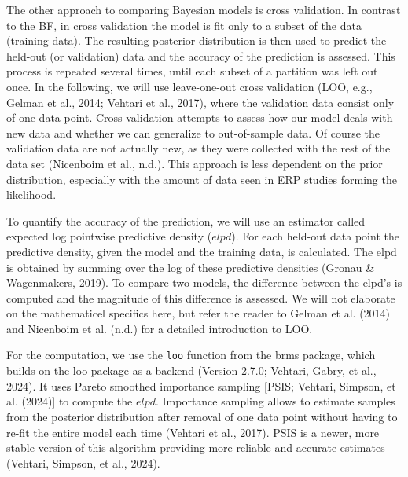 \documentclass[
  doc,12pt,floatsintext]{apa7}
\begin{document}
The other approach to comparing Bayesian models is cross validation. In contrast to the BF, in cross validation the model is fit only to a subset of the data (training data). The resulting posterior distribution is then used to predict the held-out (or validation) data and the accuracy of the prediction is assessed. This process is repeated several times, until each subset of a partition was left out once. In the following, we will use leave-one-out cross validation (LOO, e.g., Gelman et al., 2014; Vehtari et al., 2017), where the validation data consist only of one data point. Cross validation attempts to assess how our model deals with new data and whether we can generalize to out-of-sample data. Of course the validation data are not actually new, as they were collected with the rest of the data set (Nicenboim et al., n.d.). This approach is less dependent on the prior distribution, especially with the amount of data seen in ERP studies forming the likelihood.

To quantify the accuracy of the prediction, we will use an estimator called expected log pointwise predictive density (\(elpd\)). For each held-out data point the predictive density, given the model and the training data, is calculated. The elpd is obtained by summing over the log of these predictive densities (Gronau \& Wagenmakers, 2019). To compare two models, the difference between the elpd's is computed and the magnitude of this difference is assessed. We will not elaborate on the mathematicel specifics here, but refer the reader to Gelman et al. (2014) and Nicenboim et al. (n.d.) for a detailed introduction to LOO.

For the computation, we use the \texttt{loo} function from the brms package, which builds on the loo package as a backend (Version 2.7.0; Vehtari, Gabry, et al., 2024). It uses Pareto smoothed importance sampling {[}PSIS; Vehtari, Simpson, et al. (2024){]} to compute the \(elpd\). Importance sampling allows to estimate samples from the posterior distribution after removal of one data point without having to re-fit the entire model each time (Vehtari et al., 2017). PSIS is a newer, more stable version of this algorithm providing more reliable and accurate estimates (Vehtari, Simpson, et al., 2024).
\end{document}
